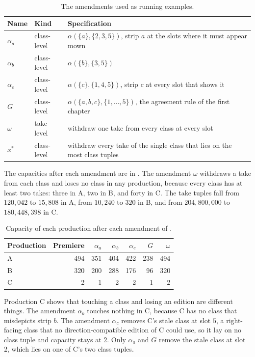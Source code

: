 \documentclass[11pt,twoside,openright]{book}
\theoremstyle{plain}
\theoremstyle{definition}
\theoremstyle{remark}
\begin{document}
\begin{table}[ht]
\centering
\begin{tabular}{@{}llp{9cm}@{}}
\toprule
Name & Kind & Specification\\
\midrule
$\alpha_a$ & class-level & $\alpha(\{a\},\{2,3,5\})$, strip $a$ at the slots where it must appear mown\\
$\alpha_b$ & class-level & $\alpha(\{b\},\{3,5\})$\\
$\alpha_c$ & class-level & $\alpha(\{c\},\{1,4,5\})$, strip $c$ at every slot that shows it\\
$G$ & class-level & $\alpha(\{a,b,c\},\{1,\dots,5\})$, the agreement rule of the first chapter\\
$\omega$ & take-level & withdraw one take from every class at every slot\\
$x^\ast$ & class-level & withdraw every take of the single class that lies on the most class tuples\\
\bottomrule
\end{tabular}
\caption{The amendments used as running examples.}\label{tab:amendments}
\end{table}

The capacities after each amendment are in . The amendment $\omega$ withdraws a take from each class and loses no class in any production, because every class has at least two takes: three in A, two in B, and forty in C. The take tuples fall from $120{,}042$ to $15{,}808$ in A, from $10{,}240$ to $320$ in B, and from $204{,}800{,}000$ to $180{,}448{,}398$ in C.

\begin{table}[ht]
\centering
\begin{tabular}{@{}lrrrrrr@{}}
\toprule
Production & Premiere & $\alpha_a$ & $\alpha_b$ & $\alpha_c$ & $G$ & $\omega$\\
\midrule
A & 494 & 351 & 404 & 422 & 238 & 494\\
B & 320 & 200 & 288 & 176 & 96 & 320\\
C & 2 & 1 & 2 & 2 & 1 & 2\\
\bottomrule
\end{tabular}
\caption{Capacity of each production after each amendment of .}\label{tab:after}
\end{table}

Production C shows that touching a class and losing an edition are different things. The amendment $\alpha_b$ touches nothing in C, because C has no class that misdepicts strip $b$. The amendment $\alpha_c$ removes C's stale class at slot $5$, a right-facing class that no direction-compatible edition of C could use, so it lay on no class tuple and capacity stays at $2$. Only $\alpha_a$ and $G$ remove the stale class at slot $2$, which lies on one of C's two class tuples.
\end{document}
